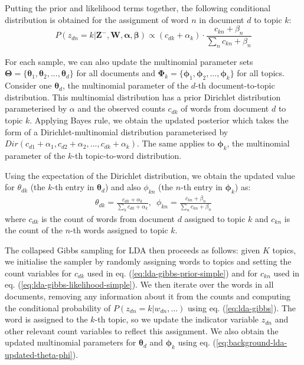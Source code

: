 Putting the prior and likelihood terms together, the following conditional distribution is obtained for the assignment of word $n$ in document $d$ to topic $k$:
\begin{equation}
P({z}_{dn}=k \vert \boldsymbol{Z}^{-}, \boldsymbol{W}, \boldsymbol{\alpha}, \boldsymbol{\beta}) \propto (c_{dk} + {\alpha}_k) \cdot \frac{ c_{kn} + {\beta}_n}{\sum_{n} c_{kn} + {\beta}_n}
\label{eq:lda-gibbs-combined}
\end{equation}

For each sample, we can also update the multinomial parameter sets $\boldsymbol{\Theta}=\{\boldsymbol{\theta}_{1}, \boldsymbol{\theta}_{2}, ..., \boldsymbol{\theta}_{d}\}$ for all documents and $\boldsymbol{\Phi}_k=\{\boldsymbol{\phi}_1, \boldsymbol{\phi}_2, ..., \boldsymbol{\phi}_k\}$ for all topics. Consider one $\boldsymbol{\theta}_{d}$, the multinomial parameter of the $d$-th document-to-topic distribution. This multinomial distribution has a prior Dirichlet distribution parameterised by $\alpha$ and the observed counts $c_{dk}$ of words from document $d$ to topic $k$. Applying Bayes rule, we obtain the updated posterior which takes the form of a Dirichlet-multinomial distribution parameterised by $Dir(c_{d1}+{\alpha}_1, c_{d2}+{\alpha}_2, ...,c_{dk}+{\alpha}_k)$. The same applies to $\boldsymbol{\phi}_{k}$, the multinomial parameter of the $k$-th topic-to-word distribution.

Using the expectation of the Dirichlet distribution, we obtain the updated value for $\theta_{dk}$ (the $k$-th entry in ${\boldsymbol{\theta}_{d}}$) and also ${\phi}_{kn}$ (the $n$-th entry in $\boldsymbol{\phi}_{k}$) as:
\begin{align}
{\theta}_{dk} = \frac{c_{dk}+{\alpha}_k}{\sum_{k} c_{dk}+{\alpha}_k}, \enspace {\phi}_{kn} = \frac{c_{kn}+{\beta}_n}{\sum_{n} c_{kn}+{\beta}_n}
\label{eq:background-lda-updated-theta-phi}
\end{align}
where $c_{dk}$ is the count of words from document $d$ assigned to topic $k$ and $c_{kn}$ is the count of the $n$-th words assigned to topic $k$. 

The collapsed Gibbs sampling for LDA then proceeds as follows: given $K$ topics, we initialise the sampler by randomly assigning words to topics and setting the count variables for $c_{dk}$ used in eq. (\ref{eq:lda-gibbs-prior-simple}) and for $c_{kn}$ used in eq. (\ref{eq:lda-gibbs-likelihood-simple}). We then iterate over the words in all documents, removing any information about it from the counts and computing the conditional probability of $P({z}_{dn}=k \vert {w}_{dn}, ...)$ using eq. (\ref{eq:lda-gibbs}). The word is assigned to the $k$-th topic, so we update the indicator variable ${z}_{dn}$ and other relevant count variables to reflect this assignment. We also obtain the updated multinomial parameters for $\boldsymbol{\theta}_d$ and $\boldsymbol{\phi}_k$ using eq. (\ref{eq:background-lda-updated-theta-phi}).

